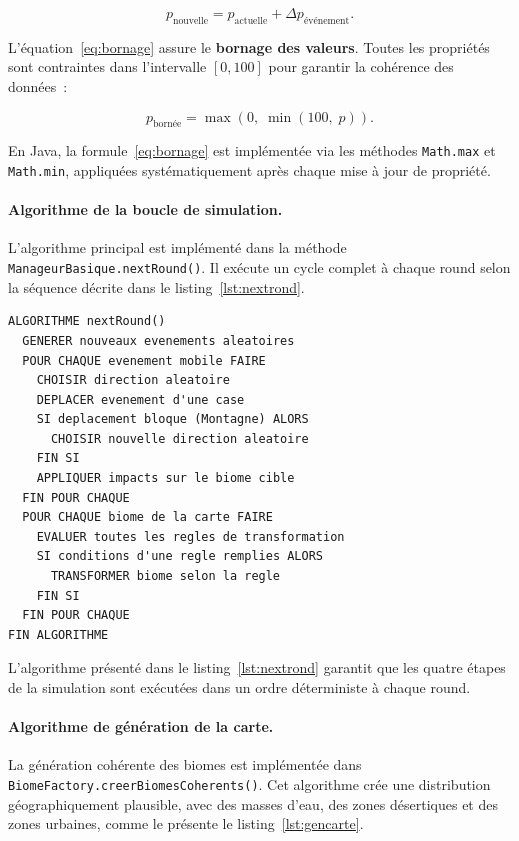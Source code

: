 \begin{equation}
  \label{eq:impact}
  p_{\text{nouvelle}} = p_{\text{actuelle}} + \Delta p_{\text{événement}}.
\end{equation}

L'équation~\ref{eq:bornage} assure le \textbf{bornage des valeurs}. Toutes les propriétés
sont contraintes dans l'intervalle $[0, 100]$ pour garantir la cohérence des
données~:

\begin{equation}
  \label{eq:bornage}
  p_{\text{bornée}} = \max\!\left(0,\; \min\!\left(100,\; p\right)\right).
\end{equation}

En Java, la formule~\ref{eq:bornage} est implémentée via les méthodes
\texttt{Math.max} et \texttt{Math.min}, appliquées systématiquement après chaque
mise à jour de propriété.

\paragraph{Algorithme de la boucle de simulation.}
L'algorithme principal est implémenté dans la méthode
\texttt{ManageurBasique.nextRound()}. Il exécute un cycle complet à chaque round
selon la séquence décrite dans le listing~\ref{lst:nextrond}.

\begin{lstlisting}[style=algo, label=lst:nextrond,
    caption={Pseudo-code de la méthode nextRound()}]
ALGORITHME nextRound()
  GENERER nouveaux evenements aleatoires
  POUR CHAQUE evenement mobile FAIRE
    CHOISIR direction aleatoire
    DEPLACER evenement d'une case
    SI deplacement bloque (Montagne) ALORS
      CHOISIR nouvelle direction aleatoire
    FIN SI
    APPLIQUER impacts sur le biome cible
  FIN POUR CHAQUE
  POUR CHAQUE biome de la carte FAIRE
    EVALUER toutes les regles de transformation
    SI conditions d'une regle remplies ALORS
      TRANSFORMER biome selon la regle
    FIN SI
  FIN POUR CHAQUE
FIN ALGORITHME
\end{lstlisting}

L'algorithme présenté dans le listing~\ref{lst:nextrond} garantit que les quatre
étapes de la simulation sont exécutées dans un ordre déterministe à chaque round.

\paragraph{Algorithme de génération de la carte.}
La génération cohérente des biomes est implémentée dans
\texttt{BiomeFactory.creerBiomesCoherents()}. Cet algorithme crée une distribution
géographiquement plausible, avec des masses d'eau, des zones désertiques et des
zones urbaines, comme le présente le listing~\ref{lst:gencarte}.

